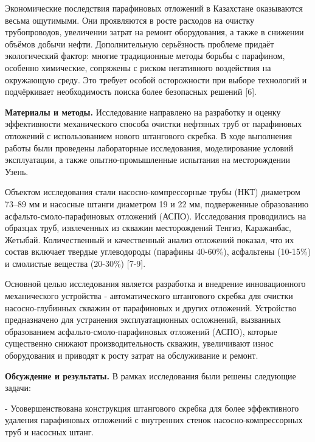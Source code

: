 
\begin{multicols}{2}
Экономические последствия парафиновых отложений в Казахстане оказываются
весьма ощутимыми. Они проявляются в росте расходов на очистку
трубопроводов, увеличении затрат на ремонт оборудования, а также в
снижении объёмов добычи нефти. Дополнительную серьёзность проблеме
придаёт экологический фактор: многие традиционные методы борьбы с
парафином, особенно химические, сопряжены с риском негативного
воздействия на окружающую среду. Это требует особой осторожности при
выборе технологий и подчёркивает необходимость поиска более безопасных
решений {[}6{]}.

{\bfseries Материалы и методы.} Исследование направлено на разработку и
оценку эффективности механического способа очистки нефтяных труб от
парафиновых отложений с использованием нового штангового скребка. В ходе
выполнения работы были проведены лабораторные исследования,
моделирование условий эксплуатации, а также опытно-промышленные
испытания на месторождении Узень.

Объектом исследования стали насосно-компрессорные трубы (НКТ) диаметром
73--89 мм и насосные штанги диаметром 19 и 22 мм, подверженные
образованию асфальто-смоло-парафиновых отложений (АСПО). Исследования
проводились на образцах труб, извлеченных из скважин месторождений
Тенгиз, Каражанбас, Жетыбай. Количественный и качественный анализ
отложений показал, что их состав включает твердые углеводороды (парафины
40-60\%), асфальтены (10-15\%) и смолистые вещества (20-30\%) {[}7-9{]}.

Основной целью исследования является разработка и внедрение
инновационного механического устройства - автоматического штангового
скребка для очистки насосно-глубинных скважин от парафиновых и других
отложений. Устройство предназначено для устранения эксплуатационных
осложнений, вызванных образованием асфальто-смоло-парафиновых отложений
(АСПО), которые существенно снижают производительность скважин,
увеличивают износ оборудования и приводят к росту затрат на обслуживание
и ремонт.

{\bfseries Обсуждение и результаты.} В рамках исследования были решены
следующие задачи:

- Усовершенствована конструкция штангового скребка для более
эффективного удаления парафиновых отложений с внутренних стенок
насосно-компрессорных труб и насосных штанг.


\end{multicols}
